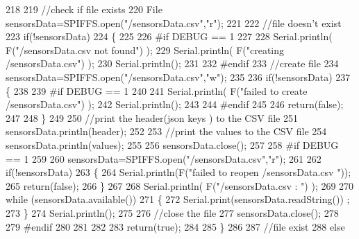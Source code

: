\begin{DoxyCode}
218 
219     \textcolor{comment}{//check if file exists}
220     File sensorsData=SPIFFS.open(\textcolor{stringliteral}{"/sensorsData.csv"},\textcolor{stringliteral}{"r"});
221     
222     \textcolor{comment}{//file doesn't exist}
223     \textcolor{keywordflow}{if}(!sensorsData)
224     \{
225     
226 \textcolor{preprocessor}{    #if DEBUG == 1}
227     
228         Serial.println( F(\textcolor{stringliteral}{"/sensorsData.csv not found"}) );
229         Serial.println( F(\textcolor{stringliteral}{"creating /sensorsData.csv"}) );
230         Serial.println();
231     
232 \textcolor{preprocessor}{    #endif}
233         \textcolor{comment}{//create file}
234         sensorsData=SPIFFS.open(\textcolor{stringliteral}{"/sensorsData.csv"},\textcolor{stringliteral}{"w"});
235         
236         \textcolor{keywordflow}{if}(!sensorsData)
237         \{
238 
239 \textcolor{preprocessor}{        #if DEBUG == 1}
240         
241             Serial.println( F(\textcolor{stringliteral}{"failed to create /sensorsData.csv"}) );
242             Serial.println();
243         
244 \textcolor{preprocessor}{        #endif}
245         
246             \textcolor{keywordflow}{return}(\textcolor{keyword}{false});
247 
248         \}
249         
250         \textcolor{comment}{//print the header(json keys ) to the CSV file}
251         sensorsData.println(header);
252 
253         \textcolor{comment}{//print the values to the CSV file}
254         sensorsData.println(values);
255         
256         sensorsData.close();
257     
258 \textcolor{preprocessor}{    #if DEBUG == 1}
259 
260         sensorsData=SPIFFS.open(\textcolor{stringliteral}{"/sensorsData.csv"},\textcolor{stringliteral}{"r"});
261         
262         \textcolor{keywordflow}{if}(!sensorsData)
263         \{
264             Serial.println(F(\textcolor{stringliteral}{"failed to reopen /sensorsData.csv "}));
265             \textcolor{keywordflow}{return}(\textcolor{keyword}{false});      
266         \}
267 
268         Serial.println( F(\textcolor{stringliteral}{"/sensorsData.csv : "}) );
269 
270         \textcolor{keywordflow}{while} (sensorsData.available()) 
271         \{
272             Serial.print(sensorsData.readString()) ;
273         \}
274         Serial.println();
275 
276         \textcolor{comment}{//close the file}
277         sensorsData.close();
278 
279 \textcolor{preprocessor}{    #endif}
280         
281 
282         
283         \textcolor{keywordflow}{return}(\textcolor{keyword}{true});
284         
285     \}
286 
287     \textcolor{comment}{//file exist}
288     \textcolor{keywordflow}{else}

\end{DoxyCode}
